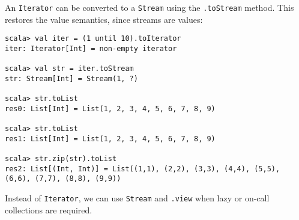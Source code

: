 An \lstinline!Iterator!
can be converted to a \lstinline!Stream!
using the \lstinline!.toStream!
method. This restores the value semantics, since streams are values:
\begin{lstlisting}
scala> val iter = (1 until 10).toIterator
iter: Iterator[Int] = non-empty iterator

scala> val str = iter.toStream
str: Stream[Int] = Stream(1, ?)

scala> str.toList
res0: List[Int] = List(1, 2, 3, 4, 5, 6, 7, 8, 9)

scala> str.toList
res1: List[Int] = List(1, 2, 3, 4, 5, 6, 7, 8, 9)

scala> str.zip(str).toList
res2: List[(Int, Int)] = List((1,1), (2,2), (3,3), (4,4), (5,5), (6,6), (7,7), (8,8), (9,9)) 
\end{lstlisting}
Instead of \lstinline!Iterator!,
we can use \lstinline!Stream!
and \lstinline!.view! when
lazy or on-call collections are required. 
